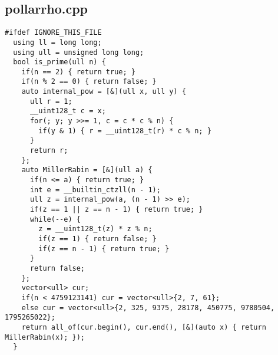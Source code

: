 \documentclass[UTF8, a4paper, titlepage, twoside]{ctexart}
\begin{document}
\subsection{pollarrho.cpp}
\begin{verbatim}
#ifdef IGNORE_THIS_FILE
  using ll = long long;
  using ull = unsigned long long;
  bool is_prime(ull n) {
    if(n == 2) { return true; }
    if(n % 2 == 0) { return false; }
    auto internal_pow = [&](ull x, ull y) {  
      ull r = 1;
      __uint128_t c = x;
      for(; y; y >>= 1, c = c * c % n) {
        if(y & 1) { r = __uint128_t(r) * c % n; }
      }
      return r;
    };
    auto MillerRabin = [&](ull a) {  
      if(n <= a) { return true; }
      int e = __builtin_ctzll(n - 1);
      ull z = internal_pow(a, (n - 1) >> e);
      if(z == 1 || z == n - 1) { return true; }
      while(--e) {
        z = __uint128_t(z) * z % n;
        if(z == 1) { return false; }
        if(z == n - 1) { return true; }
      }
      return false;
    };
    vector<ull> cur;
    if(n < 4759123141) cur = vector<ull>{2, 7, 61};
    else cur = vector<ull>{2, 325, 9375, 28178, 450775, 9780504, 1795265022};
    return all_of(cur.begin(), cur.end(), [&](auto x) { return MillerRabin(x); });
  }


\end{verbatim}
\end{document}
